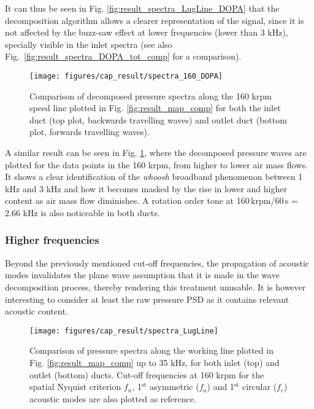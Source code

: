 It can thus be seen in Fig. \ref{fig:result_spectra_LugLine_DOPA} that the decomposition algorithm allows a clearer representation of the signal, since it is not affected by the buzz-saw effect at lower frequencies (lower than 3 kHz), specially visible in the inlet spectra (see also Fig.~\ref{fig:result_spectra_DOPA_tot_comp} for a comparison).

\begin{figure}[tbh!]
\centering
\texttt{[image: figures/cap\_result/spectra\_160\_DOPA]}
\caption{Comparison of decomposed pressure spectra along the 160 krpm speed line plotted in Fig. \ref{fig:result_map_comp} for both the inlet duct (top plot, backwards travelling waves) and outlet duct (bottom plot, forwards travelling waves).}
\label{fig:result_spectra_160_DOPA}
\end{figure}

A similar result can be seen in Fig. \ref{fig:result_spectra_160_DOPA}, where the decomposed pressure waves are plotted for the data points in the 160 krpm, from higher to lower air mass flows. It shows a clear identification of the \emph{whoosh} broadband phenomenon between 1 kHz and 3 kHz and how it becomes masked by the rise in lower and higher content as air mass flow diminishes. A rotation order tone at 160\,krpm/60\,s = 2.66 kHz is also noticeable in both ducts.

\subsubsection{Higher frequencies}
\label{sub:result_high_freq}

Beyond the previously mentioned cut-off frequencies, the propagation of acoustic modes invalidates the plane wave assumption that it is made in the wave decomposition process, thereby rendering this treatment unusable. It is however interesting to consider at least the raw pressure PSD as it contains relevant acoustic content.

\begin{figure}[b!]
\centering
\texttt{[image: figures/cap\_result/spectra\_LugLine]}
\caption{Comparison of pressure spectra along the working line  plotted in Fig. \ref{fig:result_map_comp} up to 35 kHz, for both inlet (top) and outlet (bottom) ducts. Cut-off frequencies at 160 krpm for the spatial Nyquist criterion $f_n$, 1${}^\text{st}$ asymmetric ($f_a$) and 1${}^\text{st}$ circular ($f_c$) acoustic modes are also plotted as reference.}
\label{fig:result_spectra_LugLine}
\end{figure}

